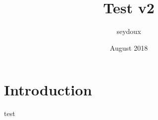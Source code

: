 \documentclass{article}
\title{Test v2}
\author{seydoux }
\date{August 2018}
\begin{document}
\maketitle

\section{Introduction}

test
\end{document}
